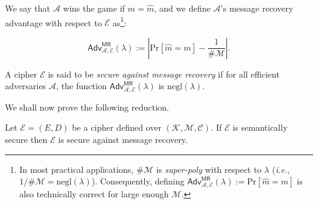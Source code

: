 \documentclass[../../book.tex]{subfiles}
\begin{document}
We say that $\mathcal{A}$ wins the game if $m=\widehat{m}$, and we define $\mathcal{A}$'s message recovery advantage with respect to $\mathcal{E}$ as\footnote{In most practical applications, $\#\mathcal{M}$ is \textit{super-poly} with respect to $\lambda$ (\textit{i.e.}, $1/\#\mathcal{M}=\text{negl}(\lambda)$). Consequently, defining $\textsf{Adv}^{\textsf{MR}}_{\mathcal{A},\mathcal{E}}(\lambda) := \text{Pr}[\widehat{m}=m]$ is also technically correct for large enough $\mathcal{M}$.}:

\begin{equation*}
    \textsf{Adv}^{\textsf{MR}}_{\mathcal{A},\mathcal{E}}(\lambda) := \left|\text{Pr}[\widehat{m} = m] - \frac{1}{\#\mathcal{M}}\right|.
\end{equation*}

\begin{definition} 
    A cipher $\mathcal{E}$ is said to be \emph{secure against message recovery} if for all efficient adversaries $\mathcal{A}$, the function $\textsf{Adv}^{\textsf{MR}}_{\mathcal{A},\mathcal{E}}(\lambda)$ is $\text{negl}(\lambda)$.
\end{definition}

We shall now prove the following reduction.

\begin{theorem}
    Let $\mathcal{E} = (E, D)$ be a cipher defined over $(\mathcal{K}, \mathcal{M}, \mathcal{C})$. If $\mathcal{E}$ is semantically secure then $\mathcal{E}$ is secure against message recovery.
\end{theorem}
\end{document}

